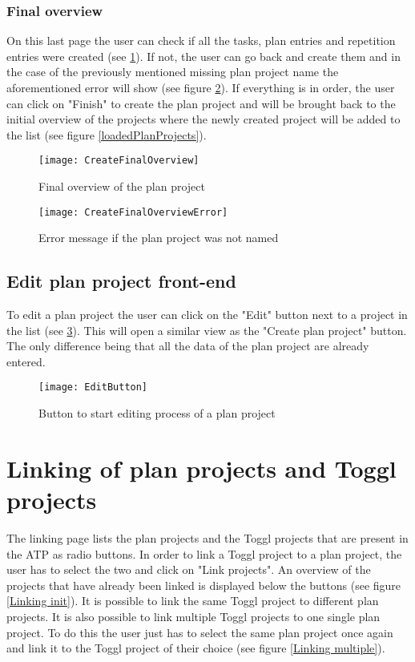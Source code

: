 \subsubsection{Final overview}
On this last page the user can check if all the tasks, plan entries and repetition entries were created (see \ref{createFinalOverview}). If not, the user can go back and create them and in the case of the previously mentioned missing plan project name the aforementioned error will show (see figure \ref{createFinalOverviewError}). If everything is in order, the user can click on "Finish" to create the plan project and will be brought back to the initial overview of the projects where the newly created project will be added to the list (see figure \ref{loadedPlanProjects}).
\begin{figure}[H]
	\centering
	\texttt{[image: CreateFinalOverview]}
	\caption{Final overview of the plan project}
	\label{createFinalOverview}
\end{figure}
\begin{figure}[H]
	\centering
	\texttt{[image: CreateFinalOverviewError]}
	\caption{Error message if the plan project was not named}
	\label{createFinalOverviewError}
\end{figure}

\subsection{Edit plan project front-end}
To edit a plan project the user can click on the "Edit" button next to a project in the list (see \ref{editButton}). This will open a similar view as the "Create plan project" button. The only difference being that all the data of the plan project are already entered.
\begin{figure}[H]
	\centering
	\texttt{[image: EditButton]}
	\caption{Button to start editing process of a plan project}
	\label{editButton}
\end{figure}

\section{Linking of plan projects and Toggl projects} \label{Linking}
The linking page lists the plan projects and the Toggl projects that are present in the ATP as radio buttons. In order to link a Toggl project to a plan project, the user has to select the two and click on "Link projects". An overview of the projects that have already been linked is displayed below the buttons (see figure \ref{Linking init}). It is possible to link the same Toggl project to different plan projects. It is also possible to link multiple Toggl projects to one single plan project. To do this the user just has to select the same plan project once again and link it to the Toggl project of their choice (see figure \ref{Linking multiple}).

